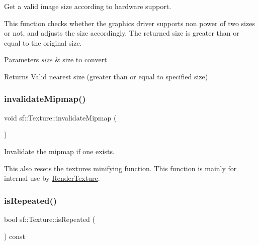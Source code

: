 Get a valid image size according to hardware support. 

This function checks whether the graphics driver supports non power of two sizes or not, and adjusts the size accordingly. The returned size is greater than or equal to the original size.


\begin{DoxyParams}{Parameters}
{\em size} & size to convert\\
\hline
\end{DoxyParams}
\begin{DoxyReturn}{Returns}
Valid nearest size (greater than or equal to specified size) \begin{DoxyVerb}\end{DoxyVerb}
 
\end{DoxyReturn}
\mbox{\label{classsf_1_1_texture_a7657c59adfbc0c640e54f7e3f12787aa}} 
\subsubsection{\texorpdfstring{invalidateMipmap()}{invalidateMipmap()}}
{\footnotesize\ttfamily void sf\+::\+Texture\+::invalidate\+Mipmap (\begin{DoxyParamCaption}{ }\end{DoxyParamCaption})\hspace{0.3cm}{\ttfamily [private]}}



Invalidate the mipmap if one exists. 

This also resets the texture\textquotesingle{}s minifying function. This function is mainly for internal use by \mbox{\hyperlink{classsf_1_1_render_texture}{Render\+Texture}}. \begin{DoxyVerb}\end{DoxyVerb}
 \mbox{\label{classsf_1_1_texture_af1a1a32ca5c799204b2bea4040df7647}} 
\subsubsection{\texorpdfstring{isRepeated()}{isRepeated()}}
{\footnotesize\ttfamily bool sf\+::\+Texture\+::is\+Repeated (\begin{DoxyParamCaption}{ }\end{DoxyParamCaption}) const}



